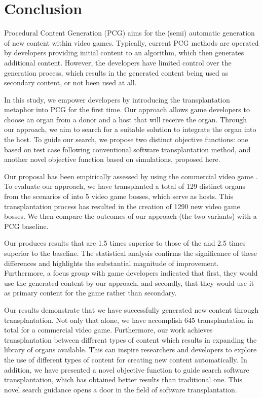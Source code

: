 \section{Conclusion}
\label{sec:Conclusion}

Procedural Content Generation (PCG) aims for the (semi) automatic generation of new content within video games.  Typically, current PCG methods are operated by developers providing initial content to an algorithm, which then generates additional content. However, the developers have limited control over the generation process, which results in the generated content being used as secondary content, or not been used at all.

In this study, we empower developers by introducing the transplantation metaphor into PCG for the first time. Our approach allows game developers to choose an organ from a donor and a host that will receive the organ. Through our approach, we aim to search for a suitable solution to integrate the organ into the host. To guide our search, we propose two distinct objective functions: one based on test case following conventional software transplantation method, and another novel objective function based on simulations, proposed here.

Our proposal has been empirically assessed by using the commercial video game \CaseStudy{}. To evaluate our approach, we have transplanted a total of 129 distinct organs from the scenarios of \CaseStudy{} into 5 video game bosses, which serve as hosts. This transplantation process has resulted in the creation of 1290 new video game bosses. We then compare the outcomes of our approach (the two variants) with a PCG baseline.

Our \simhotep{} produces results that are 1.5 times superior to those of the \timhotep{} and 2.5 times superior to the baseline. The statistical analysis confirms the significance of these differences and highlights the substantial magnitude of improvement.
Furthermore, a focus group with game developers indicated that first, they would use the generated content by our approach, and secondly, that they would use it as primary content for the game rather than secondary.

Our results demonstrate that we have successfully generated new content through transplantation. Not only that alone, we have accomplish 645 transplantation in total for a commercial video game. Furthermore, our work achieves transplantation between different types of content which results in expanding the library of organs available. This can inspire researchers and developers to explore the use of different types of content for creating new content automatically. 
In addition, we have presented a novel objective function to guide search software transplantation, which has obtained better results than traditional one. This novel search guidance opens a door in the field of software transplantation.

